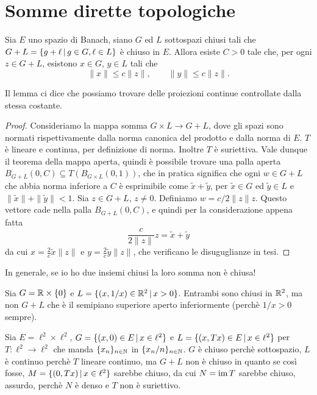 \section{Somme dirette topologiche}
\begin{lemma}
	Sia $E$ uno spazio di Banach, siano $G$ ed $L$ sottospazi chiusi tali che $G+L = \{ g + \ell \,|\, g \in G, \ell \in L\}$ è chiuso in $E$.
	Allora esiste $C > 0$ tale che, per ogni $z \in G+L$, esistono $x \in G$, $y \in L$ tali che
	\begin{equation*}
		\|x\| \leq c\|z\|, \qquad \|y\| \leq c \|z\|.
	\end{equation*}
\end{lemma}
\begin{remark}
	Il lemma ci dice che possiamo trovare delle proiezioni continue controllate dalla stessa costante.
\end{remark}
\begin{proof}
	Consideriamo la mappa somma $G \times L \to G+L$, dove gli spazi sono normati rispettivamente dalla norma canonica del prodotto e dalla norma di $E$. $T$ è lineare e continua, per definizione di norma. Inoltre $T$ è suriettiva. Vale dunque il teorema della mappa aperta, quindi è possibile trovare una palla aperta $B_{G+L}(0, C) \subseteq T(B_{G \times L}(0, 1))$, che in pratica significa che ogni $w \in G+L$ che abbia norma inferiore a $C$ è esprimibile come $\tilde x + \tilde y$, per $\tilde x \in G$ ed $\tilde y \in L$ e $\|\tilde x\|+\|\tilde y\|<1$.
	Sia $z \in G+L$, $z \neq 0$. Definiamo $w=c/2\|z\| z$. Questo vettore cade nella palla $B_{G+L}(0, C)$, e quindi per la considerazione appena fatta
	\begin{equation*}
		\frac{c}{2 \|z\|}z = \tilde x + \tilde y
	\end{equation*}
	da cui $x = \frac2c \tilde x \|z\|$ e $y= \frac2c \tilde y \|z\|$, che verificano le disuguglianze in tesi.
\end{proof}

In generale, se io ho due insiemi chiusi la loro somma non è chiusa!

\begin{counterexample}
	Sia $G = \mathbb{R} \times \{0\}$ e $L = \{(x,1/x) \in \mathbb{R}^2 \,|\, x >0\}$. Entrambi sono chiusi in $\mathbb{R}^2$, ma non $G+L$ che è il semipiano superiore aperto inferiormente (perchè $1/x > 0$ sempre).
\end{counterexample}

\begin{counterexample}
	Sia $E= \ell^2 \times \ell^2$, $G = \{(x,0) \in E \,|\, x \in \ell^2\}$ e $L=\{(x,Tx) \in E \,|\, x \in \ell^2\}$ per $T: \ell^2 \to \ell^2$ che manda $\{x_n\}_{n \in \mathbb{N}}$ in $\{x_n/n\}_{n \in \mathbb{N}}$. $G$ è chiuso perchè sottospazio, $L$ è continuo perchè $T$ lineare continuo, ma $G+L$ non è chiuso in quanto se così fosse, $M=\{(0, Tx) \,|\, x \in \ell^2\}$ sarebbe chiuso, da cui $N= \operatorname{im} T$ sarebbe chiuso, assurdo, perchè $N$ è denso e $T$ non è suriettivo.
\end{counterexample}

